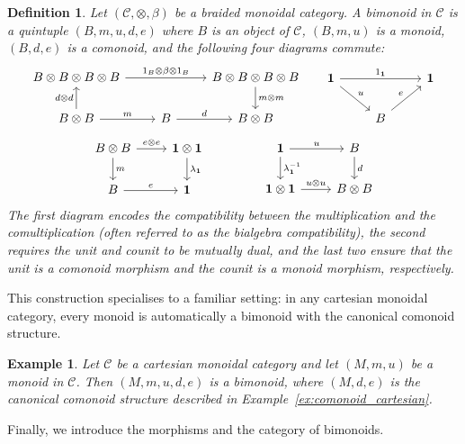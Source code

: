 \documentclass{amsart}
\newtheorem{definition}{Definition}[section]
\newtheorem{example}{Example}[section]
\begin{document}
\begin{definition}\label{def:bimonoid}
Let $(\mathcal{C}, \otimes, \beta)$ be a braided monoidal category. A bimonoid in $\mathcal{C}$ is a quintuple $(B, m, u, d, e)$ where $B$ is an object of $\mathcal{C}$, $(B, m, u)$ is a monoid, $(B, d, e)$ is a comonoid, and the following four diagrams commute:
\[
\begin{tikzcd}
B\otimes B\otimes B\otimes B\arrow{rr}{1_B\otimes \beta\otimes 1_B}&&B\otimes B\otimes B\otimes B\arrow{d}{m\otimes m}\\
B\otimes B\arrow{r}{m}\arrow{u}{d\otimes d}& B\arrow{r}{d}& B\otimes B
\end{tikzcd}
\;\;\;\;\;
\begin{tikzcd}
\mathbf{1}\arrow{rr}{1_{\mathbf{1}}}\arrow{dr}{u}&&\mathbf{1}\\
&B\arrow{ur}{e}
\end{tikzcd}
\]
\[
\begin{tikzcd}
B\otimes B\arrow{r}{e\otimes e}\arrow{d}{m}&\mathbf{1}\otimes\mathbf{1}\arrow{d}{\lambda_{\mathbf{1}}}\\
B\arrow{r}{e}&\mathbf{1}
\end{tikzcd}
\;\;\;\;\;\;\;\;\;\;\;\;\;\;\;
\begin{tikzcd}
\mathbf{1}\arrow{r}{u}\arrow{d}{\lambda_{\mathbf{1}}^{-1}}&B\arrow{d}{d}\\
\mathbf{1}\otimes \mathbf{1}\arrow{r}{u\otimes u}& B\otimes B
\end{tikzcd}
\]
The first diagram encodes the compatibility between the multiplication and the comultiplication (often referred to as the bialgebra compatibility), the second requires the unit and counit to be mutually dual, and the last two ensure that the unit is a comonoid morphism and the counit is a monoid morphism, respectively.
\end{definition}

This construction specialises to a familiar setting: in any cartesian monoidal category, every monoid is automatically a bimonoid with the canonical comonoid structure.

\begin{example}\label{ex:bimonoid_cartesian}
Let $\mathcal{C}$ be a cartesian monoidal category and let $(M, m, u)$ be a monoid in $\mathcal{C}$. Then $(M, m, u, d, e)$ is a bimonoid, where $(M, d, e)$ is the canonical comonoid structure described in Example~\ref{ex:comonoid_cartesian}.
\end{example}

Finally, we introduce the morphisms and the category of bimonoids.
\end{document}
